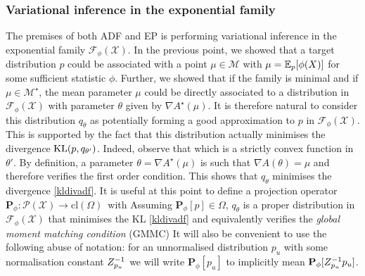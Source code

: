 \subsubsection{Variational inference in the exponential family}
%
The premises of both ADF and EP is performing variational inference in the exponential family $\mathcal F_{\phi}(\mathcal X)$. In the previous point, we showed that a target distribution $p$ could be associated with a point $\mu\in\mathcal M$ with $\mu=\mathbb E_{p}[\phi(X)]$ for some sufficient statistic $\phi$. Further, we showed that if the family is minimal and if $\mu\in\mathcal M^{\star}$, the mean parameter $\mu$ could be directly associated to a distribution in $\mathcal F_{\phi}(\mathcal X)$ with parameter $\theta$ given by $\nabla A^{\star}(\mu)$. It is therefore natural to consider this distribution $q_{\theta}$ as potentially forming a good approximation to $p$ in $\mathcal F_{\phi}(\mathcal X)$.
%
This is supported by the fact that this distribution actually minimises the divergence $\mathrm{KL}\!\left(p,q_{\theta'}\right)$. Indeed, observe that
%
%
which is a strictly convex function in $\theta'$. By definition, a parameter $\theta=\nabla A^{\star}(\mu)$ is such that $\nabla A(\theta)=\mu$ and therefore verifies the first order condition. This shows that $q_{\theta}$ minimises the divergence \eqref{kldivadf}. It is useful at this point to define a projection operator $\mathbf P_{\phi}:\mathcal P(\mathcal X) \to \mathrm{cl}(\Omega)$\, with
%
%
Assuming $\mathbf P_{\phi}[p] \in \Omega$, $q_{\theta}$ is a proper distribution in $\mathcal F_{\phi}(\mathcal X)$ that minimises the KL \eqref{kldivadf} and equivalently verifies the \emph{global moment matching condition} (GMMC) 
%
%
It will also be convenient to use the following abuse of notation: for an unnormalised distribution $p_{u}$ with some normalisation constant $Z_{p_{u}}^{-1}$ we will write $\mathbf P_{\phi}[p_{u}]$ to implicitly mean $\mathbf P_{\phi}[Z_{p_{u}}^{-1} p_{u}]$.

